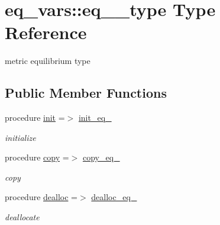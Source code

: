 \hypertarget{structeq__vars_1_1eq__2__type}{}\section{eq\+\_\+vars\+:\+:eq\+\_\+\_\+type Type Reference}
\label{structeq__vars_1_1eq__2__type}


metric equilibrium type  


\subsection*{Public Member Functions}
\begin{DoxyCompactItemize}
\item 
procedure \hyperlink{structeq__vars_1_1eq__2__type_a9fd397fc6f06c2a98c2f39c572a61415}{init} =$>$ \hyperlink{namespaceeq__vars_a93947b772250ef73b25bde7688b33bc2}{init\+\_\+eq\+\_}
\begin{DoxyCompactList}\small\item\em initialize \end{DoxyCompactList}\item 
procedure \hyperlink{structeq__vars_1_1eq__2__type_a05c42f5918724fa397f69f992732813c}{copy} =$>$ \hyperlink{namespaceeq__vars_a50561f7dcd43970bd16a31cd87714c12}{copy\+\_\+eq\+\_}
\begin{DoxyCompactList}\small\item\em copy \end{DoxyCompactList}\item 
procedure \hyperlink{structeq__vars_1_1eq__2__type_a529e547fc3dd800c64a240f313b0f356}{dealloc} =$>$ \hyperlink{namespaceeq__vars_a206698a627df7d8285921ee4a9f75c11}{dealloc\+\_\+eq\+\_}
\begin{DoxyCompactList}\small\item\em deallocate \end{DoxyCompactList}\end{DoxyCompactItemize}
